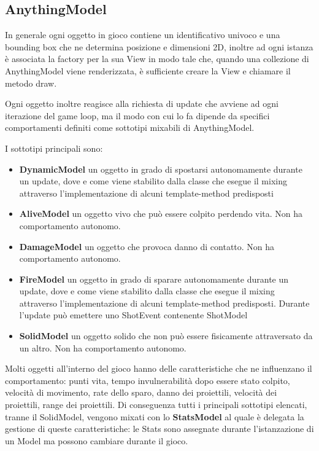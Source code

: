\subsection{AnythingModel}
In generale ogni oggetto in gioco contiene un identificativo univoco e una bounding box che ne determina posizione e dimensioni 2D, inoltre ad ogni istanza è associata la factory per la sua View in modo tale che, quando una collezione di AnythingModel viene renderizzata, è sufficiente creare la View e chiamare il metodo draw. 

Ogni oggetto inoltre reagisce alla richiesta di update che avviene ad ogni iterazione del game loop, ma il modo con cui lo fa dipende da specifici comportamenti definiti come sottotipi mixabili di AnythingModel.

I sottotipi principali sono:
\begin{itemize}
    \item \textbf{DynamicModel} un oggetto in grado di spostarsi autonomamente durante un update, dove e come viene stabilito dalla classe che esegue il mixing attraverso l'implementazione di alcuni template-method predisposti
    \item \textbf{AliveModel} un oggetto vivo che può essere colpito perdendo vita. Non ha comportamento autonomo.
    \item \textbf{DamageModel} un oggetto che provoca danno di contatto. Non ha comportamento autonomo.
    \item \textbf{FireModel} un oggetto in grado di sparare autonomamente durante un update, dove e come viene stabilito dalla classe che esegue il mixing attraverso l'implementazione di alcuni template-method predisposti. Durante l'update può emettere uno ShotEvent contenente ShotModel
    \item \textbf{SolidModel} un oggetto solido che non può essere fisicamente attraversato da un altro. Non ha comportamento autonomo.
\end{itemize}

Molti oggetti all'interno del gioco hanno delle caratteristiche che ne influenzano il comportamento: 
punti vita, tempo invulnerabilità dopo essere stato colpito, velocità di movimento, rate dello sparo, danno dei proiettili, velocità dei proiettili, range dei proiettili. 
Di conseguenza tutti i principali sottotipi elencati, tranne il SolidModel, vengono mixati con lo \textbf{StatsModel} al quale è delegata la gestione di queste caratteristiche: le Stats sono assegnate durante l'istanzazione di un Model ma possono cambiare durante il gioco.

